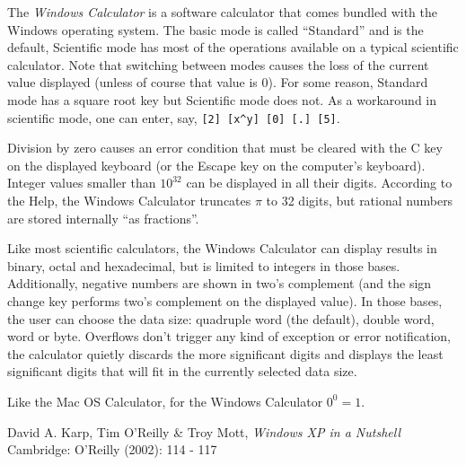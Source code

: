 \documentclass[12pt]{article}
\begin{document}
The {\em Windows Calculator} is a software calculator that comes bundled with the Windows operating system. The basic mode is called ``Standard'' and is the default, Scientific mode has most of the operations available on a typical scientific calculator. Note that switching between modes causes the loss of the current value displayed (unless of course that value is 0). For some reason, Standard mode has a square root key but Scientific mode does not. As a workaround in scientific mode, one can enter, say, \verb=[2] [x^y] [0] [.] [5]=.

Division by zero causes an error condition that must be cleared with the C key on the displayed keyboard (or the Escape key on the computer's keyboard). Integer values smaller than $10^{32}$ can be displayed in all their digits.  According to the Help, the Windows Calculator truncates $\pi$ to 32 digits, but rational numbers are stored internally ``as fractions''.

Like most scientific calculators, the Windows Calculator can display results in binary, octal and hexadecimal, but is limited to integers in those bases. Additionally, negative numbers are shown in two's complement (and the sign change key performs two's complement on the displayed value). In those bases, the user can choose the data size: quadruple word (the default), double word, word or byte. Overflows don't trigger any kind of exception or error notification, the calculator quietly discards the more significant digits and displays the least significant digits that will fit in the currently selected data size.

Like the Mac OS Calculator, for the Windows Calculator $0^0 = 1$. 

\begin{thebibliography}{1}
 David A. Karp, Tim O'Reilly \& Troy Mott, {\it Windows XP in a Nutshell} Cambridge: O'Reilly (2002): 114 - 117
\end{thebibliography}
\end{document}

